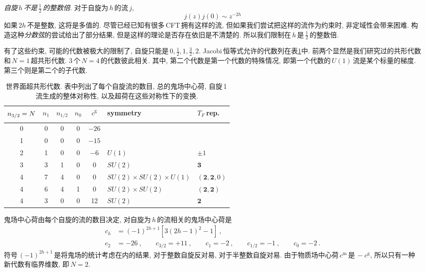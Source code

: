 {\emph{自旋$\,h\,$不是$\,\frac{1}{2}\,$的整数倍}}. 对于自旋为$\,h\,$的流$\,j$,
\begin{equation}
    j(z)j(0)\sim z^{-2h} \label{11.1.1}
\end{equation}
如果$\,2h\,$不是整数, 这将是多值的. 尽管已经已知有很多\,CFT\,拥有这样的流, 但如果我们尝试把这样的流作为约束时, 非定域性会带来困难. 构造这种{\emph{分数弦}}的尝试给出了部分结果, 但是这样的理论是否存在依旧是不清楚的. 所以我们限制在$\,h\,$是$\,\frac{1}{2}\,$的整数倍.

有了这些约束, 可能的代数被极大的限制了, 自旋只能是$\,0,\frac{1}{2},1,\frac{3}{2},2$. Jacobi\,恒等式允许的代数列在表\ref{tab:11.1}中. 前两个显然是我们研究过的共形代数和$\,N=1\,$超共形代数. 3\,个$\,N=4\,$的代数彼此相关. 其中, 第二个代数是第一个代数的特殊情况, 即第一个代数的$\,U(1)\,$流是某个标量的梯度. 第三个则是第二个的子代数.

\begin{table}[ht]
\caption{世界面超共形代数. 表中列出了每个自旋流的数目, 总的鬼场中心荷, 自旋\,1\,流生成的整体对称性, 以及超荷在这些对称性下的变换.}
\label{tab:11.1}%
\centering
\begin{tabular}[c]{cccccll}
\hline\hline
 $\vphantom{\Big[}n_{3/2}=N$ & $n_{1}$ & $n_{1/2}$ & $n_{0}$ & $c^{\text{g}}$ & symmetry & $T_{F}\:$rep. \\
\hline
 0 & 0 & 0 & 0 & $-26$ & &  \\
 1 & 0 & 0 & 0 & $-15$ & &  \\
 2 & 1 & 0 & 0 & $-6$ & $U(1)$ & $\pm1$  \\
 3 & 3 & 1 & 0 & 0 & $SU(2)$ & $\mathbf{3}$  \\
 4 & 7 & 4 & 0 & 0 & $SU(2)\times SU(2)\times U(1)$ & $(\mathbf{2},\mathbf{2},0)$  \\
 4 & 6 & 4 & 1 & 0 & $SU(2)\times SU(2)$ & $(\mathbf{2},\mathbf{2})$  \\
 4 & 3 & 0 & 0 & 12 & $SU(2)$ & $\mathbf{2}$  \\
 \hline\hline
\end{tabular}
\end{table}

鬼场中心荷由每个自旋的流的数目决定, 对自旋为$\,h\,$的流相关的鬼场中心荷是
\begin{subequations}
    \begin{align}
        c_{h}&=(-1)^{2h+1}[3(2h-1)^{2}-1] \: , \label{11.1.2a} \\
        c_{2}&=-26\:,\qquad c_{3/2}=+11\:,\qquad c_{1}=-2\:,\qquad c_{1/2}=-1\:, \qquad c_{0}=-2\:. \label{11.1.2b}
    \end{align} \label{11.1.2}
\end{subequations}
符号$\,(-1)^{2h+1}\,$是将鬼场的统计考虑在内的结果, 对于整数自旋反对易, 对于半整数自旋对易. 由于物质场中心荷$\,c^{\text{m}}\,$是$\,-c^{\text{g}}$, 所以只有一种新代数有临界维数, 即$\,N=2$.

